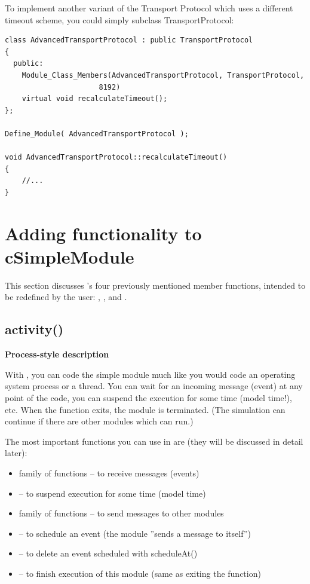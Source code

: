 To implement another variant of the Transport Protocol which uses a
different timeout scheme, you could simply subclass TransportProtocol:

\begin{verbatim}
class AdvancedTransportProtocol : public TransportProtocol
{
  public:
    Module_Class_Members(AdvancedTransportProtocol, TransportProtocol,
                      8192)
    virtual void recalculateTimeout();
};

Define_Module( AdvancedTransportProtocol );

void AdvancedTransportProtocol::recalculateTimeout()
{
    //...
}
\end{verbatim}




\section{Adding functionality to cSimpleModule}

This section discusses 's four previously
mentioned member functions, intended to be redefined by the user:
, ,  and
.


\subsection{activity()}

\textbf{Process-style description}

With , you can code the simple
module much like you would code an operating system process or a
thread. You can wait for an incoming message (event) at any point of
the code, you can suspend the execution for some time (model time!),
etc. When the  function exits, the module is
terminated.  (The simulation can continue if there are other modules
which can run.)


The most important functions you can use in  are
(they will be discussed in detail later):
\begin{itemize}
\item{ family of functions -- to receive messages (events)}
\item{ -- to suspend execution
    for some time (model time)}
\item{ family of functions -- to send messages to other
    modules}
\item{ -- to schedule an event (the module ''sends
    a message to itself'')}
\item{ -- to delete an event scheduled with
    scheduleAt()}
\item{ -- to finish execution of this module (same as
    exiting the  function)}
\end{itemize}

